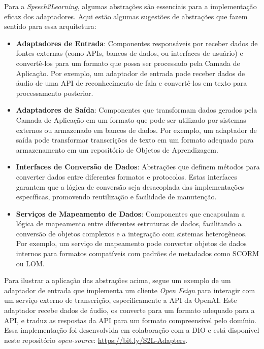 Para a \textit{Speech2Learning}, algumas abstrações são essenciais para a implementação eficaz dos adaptadores. Aqui estão algumas sugestões de abstrações que fazem sentido para essa arquitetura:

\begin{itemize}
    \item \textbf{Adaptadores de Entrada}: Componentes responsáveis por receber dados de fontes externas (como APIs, bancos de dados, ou interfaces de usuário) e convertê-los para um formato que possa ser processado pela Camada de Aplicação. Por exemplo, um adaptador de entrada pode receber dados de áudio de uma API de reconhecimento de fala e convertê-los em texto para processamento posterior.

    \item \textbf{Adaptadores de Saída}: Componentes que transformam dados gerados pela Camada de Aplicação em um formato que pode ser utilizado por sistemas externos ou armazenado em bancos de dados. Por exemplo, um adaptador de saída pode transformar transcrições de texto em um formato adequado para armazenamento em um repositório de Objetos de Aprendizagem.

    \item \textbf{Interfaces de Conversão de Dados}: Abstrações que definem métodos para converter dados entre diferentes formatos e protocolos. Estas interfaces garantem que a lógica de conversão seja desacoplada das implementações específicas, promovendo reutilização e facilidade de manutenção.

    \item \textbf{Serviços de Mapeamento de Dados}: Componentes que encapsulam a lógica de mapeamento entre diferentes estruturas de dados, facilitando a conversão de objetos complexos e a integração com sistemas heterogêneos. Por exemplo, um serviço de mapeamento pode converter objetos de dados internos para formatos compatíveis com padrões de metadados como SCORM ou LOM.
\end{itemize}

Para ilustrar a aplicação das abstrações acima, segue um exemplo de um adaptador de entrada que implementa um cliente \textit{Open Feign} para interagir com um serviço externo de transcrição, especificamente a API da OpenAI. Este adaptador recebe dados de áudio, os converte para um formato adequado para a API, e traduz as respostas da API para um formato compreensível pelo domínio. Essa implementação foi desenvolvida em colaboração com a DIO e está disponível neste repositório \textit{open-source}: \url{https://bit.ly/S2L-Adapters}.

